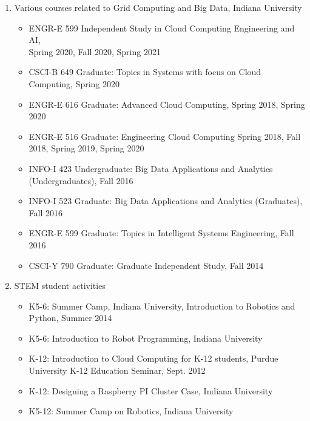 \documentclass{article}
\begin{document}
\begin{enumerate}
\item  Various courses related to Grid Computing and Big Data,  Indiana University
  \begin{itemize}
        \item ENGR-E 599 Independent Study in Cloud Computing Engineering and AI, \\ Spring 2020, Fall 2020, Spring 2021
        \item CSCI-B 649 Graduate: Topics in Systems with focus on Cloud Computing, Spring 2020
        \item ENGR-E 616 Graduate: Advanced Cloud Computing, Spring 2018, Spring 2020
        \item ENGR-E 516 Graduate: Engineering Cloud Computing Spring 2018, Fall 2018, Spring 2019, Spring 2020
        \item INFO-I 423 Undergraduate: Big Data Applications and Analytics (Undergraduates), Fall 2016 
        \item INFO-I 523 Graduate: Big Data Applications and Analytics (Graduates), Fall 2016
        \item ENGR-E 599 Graduate: Topics in Intelligent Systems Engineering, Fall 2016
        \item CSCI-Y 790 Graduate: Graduate Independent Study, Fall 2014 
  \end{itemize}

  
\item  STEM student activities

  \begin{itemize}

    \item K5-6: Summer Camp, Indiana University, Introduction to Robotics and Python, Summer 2014
    \item K5-6: Introduction to Robot Programming, Indiana University  
    \item K-12: Introduction to Cloud Computing for K-12 students, Purdue University K-12 Education Seminar, Sept. 2012
    \item K-12: Designing a Raspberry PI Cluster Case, Indiana University
    \item K5-12: Summer Camp on Robotics, Indiana University

  \end{itemize}

\end{enumerate}

  
\end{document}
